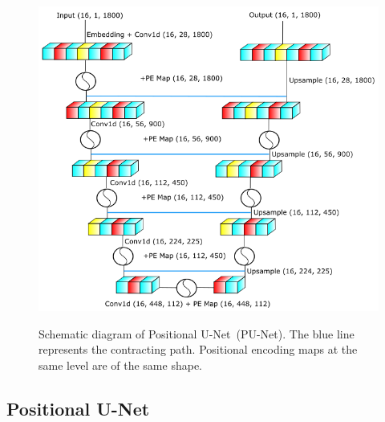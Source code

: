 \begin{figure}[htb!]
\centering
    \includegraphics[width=0.7\linewidth]{ch6/figs/unet.png}
    \label{fig:cpunet}
    \caption{Schematic diagram of Positional U-Net~(PU-Net). The blue line represents the contracting path. Positional encoding maps at the same level are of the same shape. }
   \label{fig:network_schematic}
\end{figure}



\subsection{Positional U-Net}

